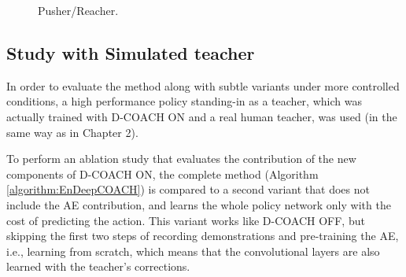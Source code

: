 \begin{figure}[h]
\centering
{} 
\hspace{0.25cm}
\hspace{0.25cm}
\hspace{0.25cm}
\caption{Pusher/Reacher.} 
\label{fig:PusherReacher} 
\end{figure}


\subsection{Study with Simulated teacher}
In order to evaluate the method along with subtle variants under more controlled conditions, a high performance policy standing-in as a teacher, which was actually trained with $\text{D-COACH ON}$ and a real human teacher, was used (in the same way as in Chapter 2).

To perform an ablation study that evaluates the contribution of the new components of D-COACH ON, the complete method (Algorithm \ref{algorithm:EnDeepCOACH}) is compared to a second variant that does not include the AE contribution, and learns the whole policy network only with the cost of predicting the action. This variant works like D-COACH OFF, but skipping the first two steps of recording demonstrations and pre-training the AE, i.e., learning from scratch, which means that the convolutional layers are also learned with the teacher's corrections.

